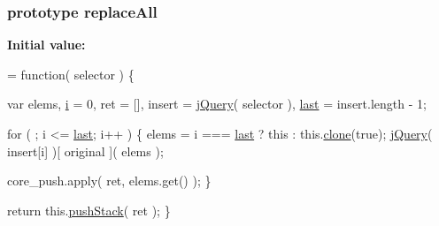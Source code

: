 \subsubsection[{replace\+All}]{ {\bf prototype} replace\+All}\label{jquery-1_810_82-vsdoc_8js_a2e887b3101a3bb067b3acfd8d292ceb0}
{\bfseries Initial value\+:}
\begin{DoxyCode}
= \textcolor{keyword}{function}( selector ) \{


        var elems,
            \hyperlink{_bibabook_2_scripts_2respond_8min_8js_a5e25b1d1bed9ab5f3174b76d6a722180}{i} = 0,
            ret = [],
            insert = \hyperlink{jquery-1_810_82-vsdoc_8js_add5237586d970a38a81f990e8eb28c6c}{jQuery}( selector ),
            \hyperlink{jquery-1_810_82-vsdoc_8js_a5a9684d230de11a6ec3029bcce128977}{last} = insert.length - 1;

        \textcolor{keywordflow}{for} ( ; i <= \hyperlink{jquery-1_810_82-vsdoc_8js_a5a9684d230de11a6ec3029bcce128977}{last}; i++ ) \{
            elems = i === \hyperlink{jquery-1_810_82-vsdoc_8js_a5a9684d230de11a6ec3029bcce128977}{last} ? \textcolor{keyword}{this} : this.\hyperlink{jquery-1_810_82-vsdoc_8js_a7d74ce76585989b4b6e2d506577e13ad}{clone}(\textcolor{keyword}{true});
            \hyperlink{jquery-1_810_82-vsdoc_8js_add5237586d970a38a81f990e8eb28c6c}{jQuery}( insert[i] )[ original ]( elems );

            
            core\_push.apply( ret, elems.get() );
        \}

        \textcolor{keywordflow}{return} this.\hyperlink{jquery-1_810_82-vsdoc_8js_afc3a7db1ef2b526338c06c07cecccd44}{pushStack}( ret );
    \}
\end{DoxyCode}
\hypertarget{jquery-1_810_82-vsdoc_8js_adefc41a8d3d9f7f534df4b2171d70141}{}
